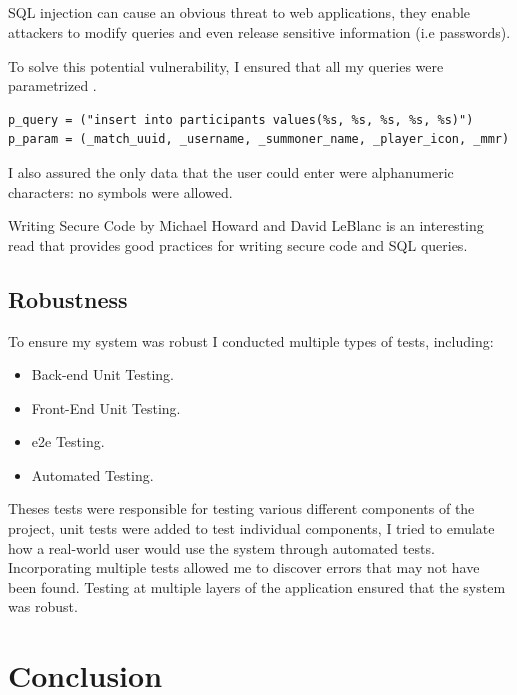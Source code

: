 \paragraph{}
SQL injection \cite{halfond2006classification} can cause an obvious threat to web applications, they enable attackers to modify queries and even release sensitive information (i.e passwords).

To solve this potential vulnerability, I ensured that all my queries were parametrized \cite{psycopg}.
\begin{verbatim}
p_query = ("insert into participants values(%s, %s, %s, %s, %s)")
p_param = (_match_uuid, _username, _summoner_name, _player_icon, _mmr)
\end{verbatim}
I also assured the only data that the user could enter were alphanumeric characters: no symbols were allowed.

Writing Secure Code\cite{howard2003writing} by Michael Howard and David LeBlanc is an interesting read that provides good practices for writing secure code and SQL queries.

\section{Robustness}
To ensure my system was robust I conducted multiple types of tests, including:

\begin{itemize}
	\item Back-end Unit Testing.
	\item Front-End Unit Testing.
	\item e2e Testing.
	\item Automated Testing.
\end{itemize}

Theses tests were responsible for testing various different components of the project, unit tests were added to test individual components, I tried to emulate how a real-world user would use the system through automated tests.\newline
Incorporating multiple tests allowed me to discover errors that may not have been found. Testing at multiple layers of the application ensured that the system was robust.
\chapter{Conclusion}

